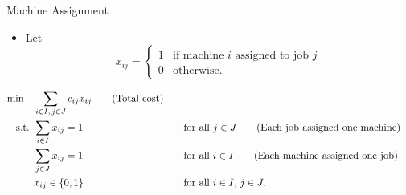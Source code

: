 \begin{examplewithallcode}{Machine Assignment}
\begin{itemize}
\item Let
\begin{equation*}
x_{ij} = \begin{cases}
1 & \text{if machine $i$ assigned to job $j$}\\
0 & \text{otherwise.}
\end{cases}
\end{equation*}
\end{itemize}

\begin{align*}
\min \quad & \sum_{i \in I,\, j \in J} c_{ij} x_{ij}   \tag{Total cost} \\
\mbox{ s.t. }        & \sum_{i \in I} x_{ij} = 1 &&\quad \mbox{for all } j \in J   \tag{Each job assigned one machine} \\
             & \sum_{j \in J} x_{ij} = 1 &&\quad \mbox{for all } i \in I   \tag{Each machine assigned one job} \\
             & x_{ij} \in \{0,1\} &&\quad \mbox{for all } i \in I,\, j \in J.
\end{align*}
\end{examplewithallcode}

